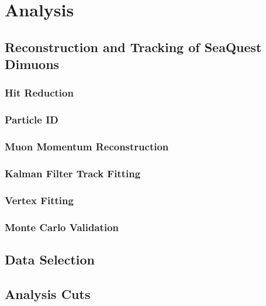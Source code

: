 \chapter{Analysis}



\section{Reconstruction and Tracking of SeaQuest Dimuons}

\subsection{Hit Reduction}

\subsection{Particle ID}

\subsection{Muon Momentum Reconstruction}

\subsection{Kalman Filter Track Fitting}

\subsection{Vertex Fitting}

\subsection{Monte Carlo Validation}

\section{Data Selection}


\section{Analysis Cuts}



